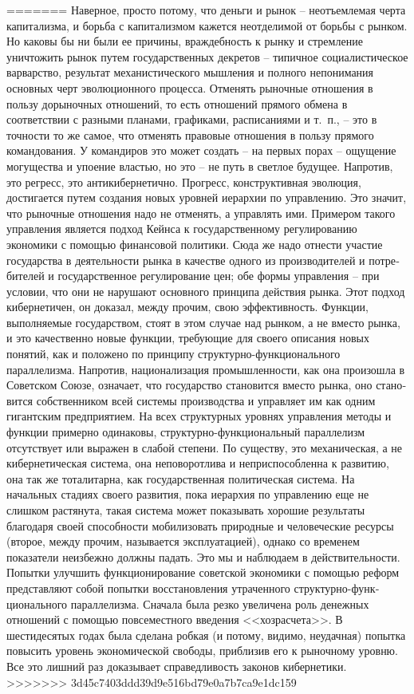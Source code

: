 \documentclass{book}
\begin{document}
=======
Наверное, просто потому, что деньги и рынок -- неотъемле­мая черта капитализма, и борьба с капитализмом кажется неот­делимой от борьбы с рынком. Но каковы бы ни были ее причи­ны, враждебность к рынку и стремление уничтожить рынок путем государственных декретов -- типичное социалистическое варварство, результат механистического мышления и полного непонимания основных черт эволюционного процесса. Отменять рыночные отношения в пользу дорыночных отношений, то есть отношений прямого обмена в соответствии с разными планами, графиками, расписаниями и т.~п., -- это в точности то же самое, что отменять правовые отношения в пользу прямого командо­вания. У командиров это может создать -- на первых порах -- ощущение могущества и упоение властью, но это -- не путь в светлое будущее. Напротив, это регресс, это антикибернетично. Прогресс, конструктивная эволюция, достигается путем со­здания новых уровней иерархии по управлению. Это значит, что рыночные отношения надо не отменять, а управлять ими. Примером такого управления 
является подход Кейнса к госу­дарственному регулированию экономики с помощью финансо­вой политики. Сюда же надо отнести участие государства в дея­тельности рынка в качестве одного из производителей и потре­бителей и государственное регулирование цен; обе формы уп­равления -- при условии, что они не нарушают основного прин­ципа действия рынка. Этот подход кибернетичен,  он доказал, между прочим, свою эффективность. Функции, выполняемые государством, стоят в этом случае над  рынком, а не вместо рынка, и это качественно новые функции, требующие для своего описания новых понятий, как и положено по принципу струк­турно-функционального параллелизма. Напротив, национализа­ция промышленности, как она произошла в Советском Союзе, означает, что государство становится вместо  рынка, оно стано­вится собственником всей системы производства и управляет им как одним гигантским предприятием. На всех структурных уровнях управления методы и функции примерно одинаковы, структурно-функциональный параллелизм отсутствует или 
выра­жен в слабой степени. По существу, это механическая, а не ки­бернетическая система, она неповоротлива и неприспособленна к развитию, она так же тоталитарна, как государственная поли­тическая система. На начальных стадиях своего развития, пока иерархия по управлению еще не слишком растянута, такая си­стема может показывать хорошие результаты благодаря своей способности мобилизовать природные и человеческие ресурсы (второе, между прочим, называется эксплуатацией),  однако со временем показатели неизбежно должны падать. Это мы и на­блюдаем в действительности. Попытки улучшить функциони­рование советской экономики с помощью реформ представляют собой попытки восстановления утраченного структурно-функ­ционального параллелизма. Сначала была резко увеличена роль денежных отношений с помощью повсеместного введения <<хозрасчета>>. В шестидесятых годах была сделана робкая (и потому, видимо, неудачная) попытка повысить уровень экономической свободы, приблизив его к рыночному уровню. Все это лишний раз доказывает 
справедливость законов кибернетики.
>>>>>>> 3d45c7403ddd39d9e516bd79e0a7b7ca9e1dc159
\end{document}
